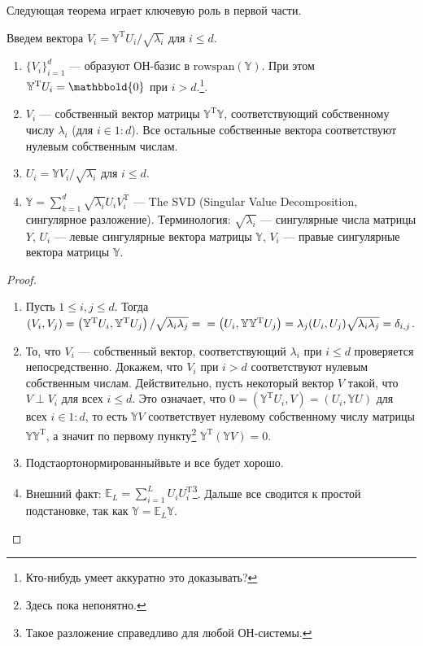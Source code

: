 Следующая теорема играет ключевую роль в первой части.
\begin{thm}
    Введем вектора $V_i = \mathbb Y^\mathrm T U_i / \sqrt{\lambda_i}$ для $i \leqslant d$. 
    \begin{enumerate}
        \item $\{V_i\}_{i = 1}^d$ --- образуют ОН-базис в $\mathrm{rowspan}(\mathbb Y)$. При этом $\mathbb Y^\mathrm T U_i = \mathbbold{0}$ при $i>d$.\footnote{\color{blue} Кто-нибудь умеет аккуратно это доказывать?}.
        \item $V_i$ --- собственный вектор матрицы $\mathbb Y^\mathrm T \mathbb Y$, соответствующий собственному числу $\lambda_i$ (для $i \in 1:d$).
              Все остальные собственные вектора соответствуют нулевым собственным числам.
        \item $U_i = \mathbb Y V_i / \sqrt{\lambda_i}$ для $i \leqslant d$.
        \item $\mathbb Y = \sum_{k = 1}^d \sqrt{\lambda_i} U_i V_i^\mathrm T$ --- The SVD (Singular Value Decomposition, сингулярное разложение). Терминология: $\sqrt{\lambda_i}$ --- сингулярные числа матрицы $Y$,
              $U_i$ --- левые сингулярные вектора матрицы $\mathbb Y$, $V_i$ --- правые сингулярные вектора матрицы $\mathbb Y$.
    \end{enumerate}
\end{thm}

\begin{proof}
    \begin{enumerate}
        \item Пусть $1 \leqslant i, j \leqslant d$. Тогда $(V_i, V_j) = \left(\mathbb Y^\mathrm T U_i, \mathbb Y^\mathrm T U_j\right) / \sqrt{\lambda_i \lambda_j}= \\ =
              \left(U_i, \mathbb Y \mathbb Y^\mathrm T U_j\right) = \lambda_j (U_i, U_j) \sqrt{\lambda_i \lambda_j} = \delta_{i,j}$.
        \item То, что $V_i$ --- собственный вектор, соответствующий $\lambda_i$ при $i \leqslant d$ проверяется непосредственно. Докажем, что
              $V_i$ при $i > d$ соответствуют нулевым собственным числам. Действительно, пусть некоторый вектор $V$ такой, что $V \perp V_i$ для всех $i \leqslant d$.
              Это означает, что $0 = (\mathbb Y^\mathrm T U_i, V) = (U_i, \mathbb Y U)$ для всех $i \in 1:d$, то есть $\mathbb Y V$ соответствует нулевому собственному числу матрицы $\mathbb Y \mathbb Y^\mathrm T$,
              а значит по первому пункту\footnote{\color{blue} Здесь пока непонятно.}
              $\mathbb Y^\mathrm T (\mathbb Y V) =0$.
        \item Подстаортонормированныйвьте и все будет хорошо.
        \item Внешний факт: $\mathbb E_{L} = \sum_{i=1}^L U_i U_i^\mathrm T$\footnote{Такое разложение справедливо для любой ОН-системы.}.
              Дальше все сводится к простой подстановке, так как $\mathbb Y = \mathbb E_L \mathbb Y$.
    \end{enumerate}          
\end{proof}

